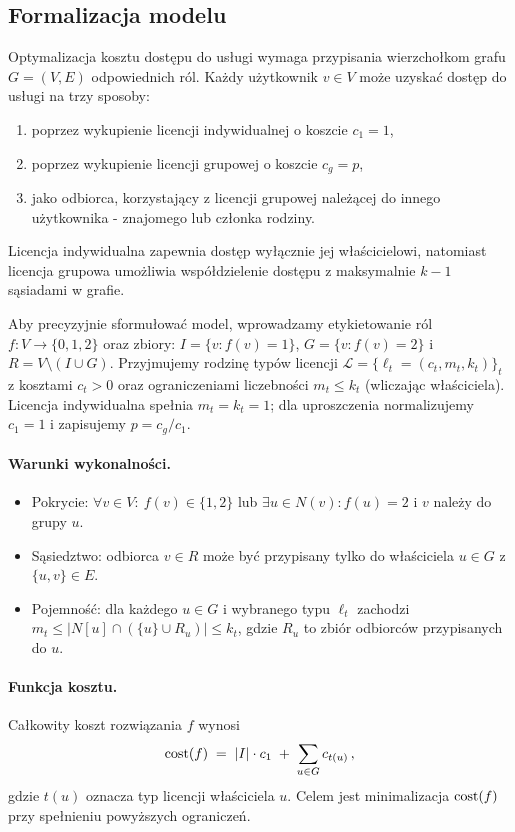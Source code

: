 \subsection{Formalizacja modelu}
\label{sec:model-formal}

Optymalizacja kosztu dostępu do usługi wymaga przypisania wierzchołkom grafu $G = (V, E)$ odpowiednich ról. Każdy użytkownik $v \in V$ może uzyskać dostęp do usługi na trzy sposoby:
\begin{enumerate}
    \item poprzez wykupienie licencji indywidualnej o koszcie $c_1 = 1$,
    \item poprzez wykupienie licencji grupowej o koszcie $c_g = p$,
    \item jako odbiorca, korzystający z licencji grupowej należącej do innego  użytkownika - znajomego lub członka rodziny.
\end{enumerate}
Licencja indywidualna zapewnia dostęp wyłącznie jej właścicielowi, natomiast licencja grupowa umożliwia współdzielenie dostępu z maksymalnie $k-1$ sąsiadami w grafie. 

\noindent Aby precyzyjnie sformułować model, wprowadzamy etykietowanie ról $f:V\to\{0,1,2\}$ oraz zbiory: $I=\{v:f(v)=1\}$, $G=\{v:f(v)=2\}$ i $R=V\setminus(I\cup G)$. Przyjmujemy rodzinę typów licencji $\mathcal{L}=\{\ell_t=(c_t,m_t,k_t)\}_t$ z kosztami $c_t>0$ oraz ograniczeniami liczebności $m_t\le k_t$ (wliczając właściciela). Licencja indywidualna spełnia $m_t=k_t=1$; dla uproszczenia normalizujemy $c_1=1$ i zapisujemy $p=c_g/c_1$.

\paragraph{Warunki wykonalności.}
\begin{itemize}
  \item Pokrycie: $\forall v\in V:\ f(v)\in\{1,2\}$ lub $\exists u\in N(v): f(u)=2$ i $v$ należy do grupy $u$.
  \item Sąsiedztwo: odbiorca $v\in R$ może być przypisany tylko do właściciela $u\in G$ z $\{u,v\}\in E$.
  \item Pojemność: dla każdego $u\in G$ i wybranego typu $\ell_t$ zachodzi $m_t\le |N[u]\cap (\{u\}\cup R_u)|\le k_t$, gdzie $R_u$ to zbiór odbiorców przypisanych do $u$.
\end{itemize}

\paragraph{Funkcja kosztu.}
Całkowity koszt rozwiązania $f$ wynosi
\[
  \operatorname{cost}(f)\;=\;|I|\cdot c_1\; +\; \sum_{u\in G} c_{t(u)}\, ,
\]
gdzie $t(u)$ oznacza typ licencji właściciela $u$. Celem jest minimalizacja $\operatorname{cost}(f)$ przy spełnieniu powyższych ograniczeń.

